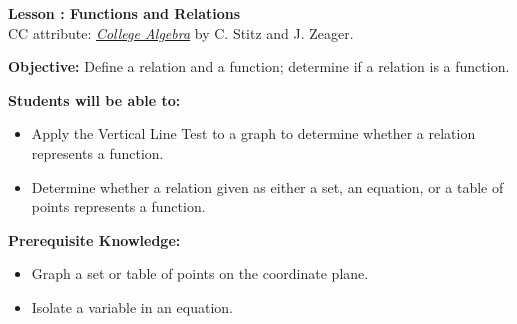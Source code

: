 \documentclass[12pt]{article}
\theoremstyle{definition}
\begin{document}
{\bf \large Lesson : Functions and Relations}\label{les:functions_and_relations}
\\ CC attribute: \href{http://www.stitz-zeager.com}{\it{College Algebra}} by C. Stitz and J. Zeager. 
\hfill \doclicenseImage[imagewidth=5em]\\
\par
{\bf Objective:} Define a relation and a function; determine if a relation is a function.\\
\par
{\bf Students will be able to:}
\begin{itemize}
	\item Apply the Vertical Line Test to a graph to determine whether a relation represents a function.
	\item Determine whether a relation given as either a set, an equation, or a table of points represents a function.
\end{itemize}
{\bf Prerequisite Knowledge:}
\begin{itemize}
	\item Graph a set or table of points on the coordinate plane.
	\item Isolate a variable in an equation.
\end{itemize}
\hrulefill
\end{document}
